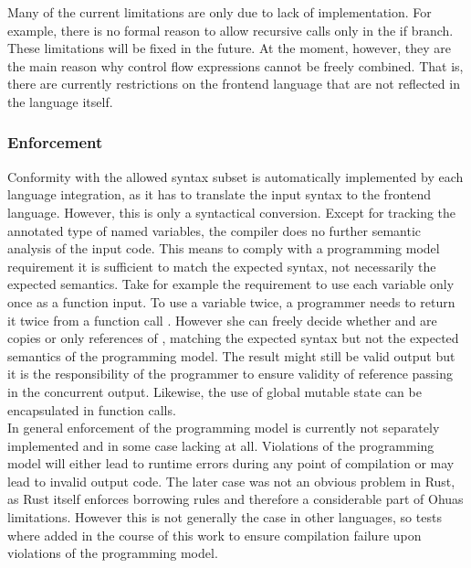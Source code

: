 Many of the current limitations are only due to lack of implementation. For example, there is no formal reason to allow recursive calls only in the if branch. These limitations will be fixed in the future. At the moment, however, they are the main reason why control flow expressions cannot be freely combined. That is, there are currently restrictions on the frontend language that are not reflected in the language itself.



\subsubsection{Enforcement}

Conformity with the allowed syntax subset is automatically implemented by each language integration, as it has to translate the input syntax to the frontend language. However, this is only a syntactical conversion. Except for tracking the annotated type of named variables, the compiler does no further semantic analysis of the input code. This means to comply with a programming model requirement it is sufficient to match the expected syntax, not necessarily the expected semantics. Take for example the requirement to use each variable only once as a function input. To use a variable  twice, a programmer needs to return it twice from a function call . However she can freely decide whether  and  are copies or only references of , matching the expected syntax but not the expected semantics of the programming model. The result might still be valid output but it is the responsibility of the programmer to ensure validity of reference passing in the concurrent output. Likewise, the use of global mutable state can be encapsulated in function calls. \\

In general enforcement of the programming model is currently not separately implemented and in some case lacking at all. Violations of the programming model will either lead to runtime errors during any point of compilation or may lead to invalid output code. The later case was not an obvious problem in Rust, as Rust itself enforces borrowing rules and therefore a considerable part of Ohuas limitations. However this is not generally the case in other languages, so tests where added in the course of this work to ensure compilation failure upon violations of the programming model.


